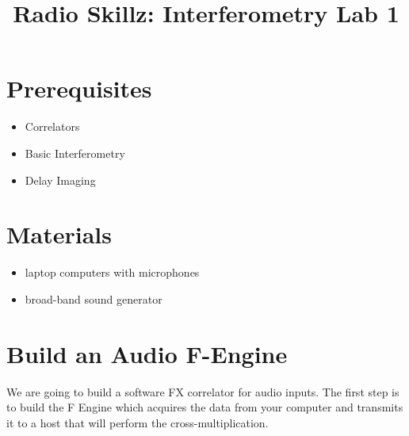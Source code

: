 \documentclass[11pt]{article}
\begin{document}
\title{Radio Skillz: Interferometry Lab 1}

\maketitle

\section*{Prerequisites}

\begin{itemize}
\item Correlators
\item Basic Interferometry
\item Delay Imaging
\end{itemize}

\section*{Materials}

\begin{itemize}
\item laptop computers with microphones
\item broad-band sound generator
\end{itemize}

\section{Build an Audio F-Engine}

We are going to build a software FX correlator for audio inputs.  The first step is to build the
F Engine which acquires the data from your computer and transmits it to a host that will perform
the cross-multiplication.
\end{document}
